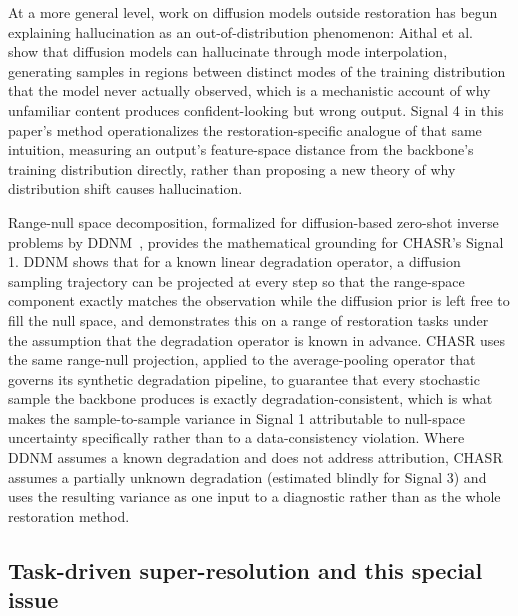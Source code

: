 \documentclass[review]{elsarticle}
\begin{document}
At a more general level, work on diffusion models outside restoration has begun explaining hallucination as an out-of-distribution phenomenon: Aithal et al.~\citep{aithal2024hallucinations} show that diffusion models can hallucinate through mode interpolation, generating samples in regions between distinct modes of the training distribution that the model never actually observed, which is a mechanistic account of why unfamiliar content produces confident-looking but wrong output. Signal 4 in this paper's method operationalizes the restoration-specific analogue of that same intuition, measuring an output's feature-space distance from the backbone's training distribution directly, rather than proposing a new theory of why distribution shift causes hallucination.

Range-null space decomposition, formalized for diffusion-based zero-shot inverse problems by DDNM~\citep{wang2023ddnm}, provides the mathematical grounding for CHASR's Signal 1. DDNM shows that for a known linear degradation operator, a diffusion sampling trajectory can be projected at every step so that the range-space component exactly matches the observation while the diffusion prior is left free to fill the null space, and demonstrates this on a range of restoration tasks under the assumption that the degradation operator is known in advance. CHASR uses the same range-null projection, applied to the average-pooling operator that governs its synthetic degradation pipeline, to guarantee that every stochastic sample the backbone produces is exactly degradation-consistent, which is what makes the sample-to-sample variance in Signal 1 attributable to null-space uncertainty specifically rather than to a data-consistency violation. Where DDNM assumes a known degradation and does not address attribution, CHASR assumes a partially unknown degradation (estimated blindly for Signal 3) and uses the resulting variance as one input to a diagnostic rather than as the whole restoration method.

\subsection{Task-driven super-resolution and this special issue}
\end{document}
